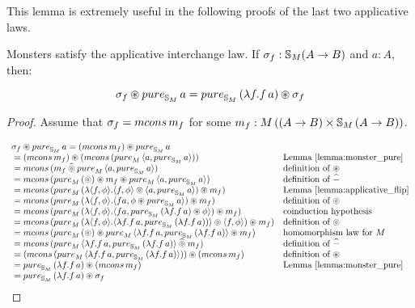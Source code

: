 This lemma is extremely useful in the following proofs of the last two applicative laws.

\begin{lemma}
Monsters satisfy the applicative interchange law.
 If $\sigma_f: \mathbb{S}_{M}(A\rightarrow B)$ and $a:A$, then:

$$
\sigma_f \appl \apure_{\stream{M}}\,a = \apure_{\stream{M}}\,(\lambda f. f\,a) \appl \sigma_f
$$

\end{lemma}
\begin{proof}
Assume that $\sigma_f = \mcons\,m_f$ for some $m_f:M\,((A\rightarrow B)\times \mathbb{S}_{M}\,(A\rightarrow B))$.

$$
\begin{array}{ll}
\sigma_f \appl \apure_{\stream{M}}\,a = (\mcons\,m_f) \appl \apure_{\stream{M}}\,a \\
{}= (\mcons\,m_f) \appl (\mcons\,(\apure_M\,\langle a, \apure_{\stream{M}}\,a\rangle))
  & \mbox{Lemma \ref{lemma:monster_pure}}\\
{}= \mcons\,(m_f \alift{\pappl} \apure_M\,\langle a, \apure_{\stream{M}}\,a\rangle)
  & \mbox{definition of }\appl\\
{}= \mcons\,(\apure_M\,(\pappl) \appl m_f \appl \apure_M\,\langle a, \apure_{\stream{M}}\,a\rangle)
  & \mbox{definition of }\alift{-}\\
{}= \mcons \, (\apure_M\,(\lambda \pair{f}{\phi} . \pair{f}{\phi} \pappl \pair{a}{\apure_{\stream{M}}\,a}) \appl m_f)
  & \mbox{Lemma \ref{lemma:applicative_flip}}\\
{}= \mcons\,(\apure_M\,(\lambda \pair{f}{\phi} . \pair{f a}{\phi \appl \apure_{\stream{M}}\,a}) \appl m_f)
  & \mbox{definition of } \pappl \\
{}= \mcons\,(\apure_M\,(\lambda \pair{f}{\phi} . \pair{f a}{\apure_{\stream{M}}\,(\lambda f . f\, a) \appl \phi}) \appl m_f)
  & \mbox{coinduction hypothesis} \\
{}= \mcons\,(\apure_M\,(\lambda \pair{f}{\phi}.
    \pair{\lambda f . f\, a}{\apure_{\stream{M}}\,(\lambda f . f\, a))}
    \pappl \pair{f}{\phi}
    ) \appl m_f)
  & \mbox{definition of } \pappl \\
{}= \mcons\,(\apure_M\,(\pappl) \appl \apure_M\,\langle \lambda f. f\,a, \apure_{\stream{M}}\,(\lambda f. f\,a)  \rangle \appl m_f)
  & \mbox{homomorphism law for }M \\
{}= \mcons\,(\apure_M\,\langle \lambda f. f\,a, \apure_{\stream{M}}\,(\lambda f. f\,a)  \rangle \alift{\pappl} m_f)
  & \mbox{definition of }\alift{-}\\
{}= (\mcons\,(\apure_M\,\langle \lambda f. f\,a, \apure_{\stream{M}}\,(\lambda f. f\,a)  \rangle)) \appl (\mcons\,m_f)
  & \mbox{definition of }\appl \\
{}= \apure_{\stream{M}}\,(\lambda f. f\,a) \appl (\mcons\,m_f)
  & \mbox{Lemma \ref{lemma:monster_pure}} \\
{} = \apure_{\stream{M}}\,(\lambda f. f\,a) \appl \sigma_f
\end{array}
$$
\end{proof}


